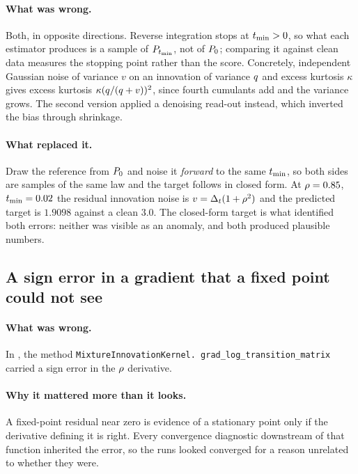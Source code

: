 \paragraph{What was wrong.} Both, in opposite directions. Reverse integration stops at
$t_{\min}>0$, so what each estimator produces is a sample of $P_{t_{\min}}$, not of $P_0$; comparing it
against clean data measures the stopping point rather than the score. Concretely, independent
Gaussian noise of variance $v$ on an innovation of variance $q$ and excess kurtosis $\kappa$
gives excess kurtosis $\kappa(q/(q+v))^2$, since fourth cumulants add and the variance
grows. The second version applied a denoising read-out instead, which inverted the bias through
shrinkage.

\paragraph{What replaced it.} Draw the reference from $P_0$ and noise it \emph{forward} to the
same $t_{\min}$, so both sides are samples of the same law and the target follows in closed form. At
$\rho=0.85$, $t_{\min}=0.02$ the residual innovation noise is $v=\Delta_t(1+\rho^2)$ and the predicted
target is $1.9098$ against a clean $3.0$. The closed-form target is what identified both errors:
neither was visible as an anomaly, and both produced plausible numbers.

\subsection{A sign error in a gradient that a fixed point could not see}
\label{sec:corr-gradient}

\paragraph{What was wrong.} In , the method
\texttt{\small MixtureInnovationKernel.\allowbreak
grad\_\allowbreak log\_\allowbreak transition\_\allowbreak matrix} carried a
sign error in the $\rho$ derivative.

\paragraph{Why it mattered more than it looks.} A fixed-point residual near zero is evidence of a
stationary point only if the derivative defining it is right. Every convergence diagnostic
downstream of that function inherited the error, so the runs looked converged for a reason
unrelated to whether they were.

